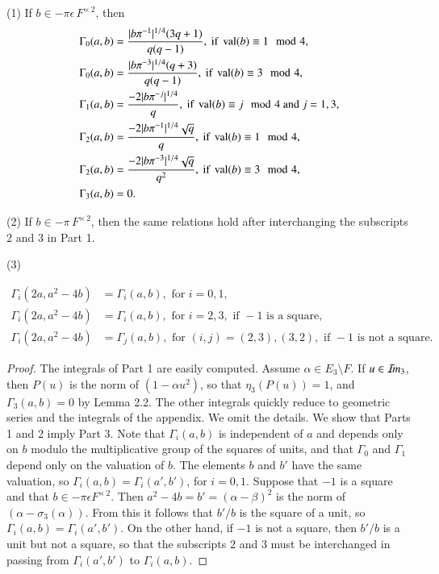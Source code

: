 \documentclass{amsart}
\newcommand\Imm{{\mathcal I\hskip-.2em m}}
\newcommand\val{\operatorname{val}}
\newenvironment{cthm}[1]
  {\renewcommand\thethm{\sc #1}\thm}
  {\endthm}
\begin{document}
\bigskip
\noindent
\begin{cthm}{Lemma 2.6}
(1)  If $b\in -\pi\epsilon\,F^{\times\,2}$, then
\begin{align*}
\Gamma_0(a,b) &= {|b\pi^{-1}|^{1/4}(3q+1)\over q(q-1)}, \text{ if }
			\val(b)\equiv 1 \mod 4,\\
\Gamma_0(a,b) &= {|b\pi^{-3}|^{1/4}(q+3)\over q(q-1)}, \text{ if }
			\val(b)\equiv 3 \mod 4,\\
\Gamma_1(a,b) &= {-2|b\pi^{-j}|^{1/4}\over q}, \text{ if }
			\val(b)\equiv j \mod 4 \text{ and } j=1, 3,\\
\Gamma_2(a,b) &= {-2|b\pi^{-1}|^{1/4}\sqrt{q}\over q}, \text{ if }
			\val(b)\equiv 1 \mod 4,\\
\Gamma_2(a,b) &= {-2|b\pi^{-3}|^{1/4}\sqrt{q}\over q^2}, \text{ if }
			\val(b)\equiv 3 \mod 4,\\
\Gamma_3(a,b) &= 0.
\end{align*}
\smallskip

(2)  If $b\in -\pi\,F^{\times\,2}$, then the same relations
hold after interchanging the subscripts $2$ and $3$ in Part 1.


\smallskip
(3)

\begin{align*}
\Gamma_i(2a,a^2-4b) &= \Gamma_i(a,b), \text{ for } i=0,1,\\
\Gamma_i(2a,a^2-4b) &= \Gamma_i(a,b), \text{ for } i=2,3, \text{ if }
		-1 \text{ is a square,}\\
\Gamma_i(2a,a^2-4b) &= \Gamma_j(a,b), \text{ for } (i,j) = (2,3), (3,2),
		\text{ if } -1 \text { is not a square.}
\end{align*}

\end{cthm}

\smallskip

\noindent
\begin{proof}
The integrals of Part 1 are easily computed. 
Assume 
$\alpha\in E_3\setminus F$.  
If $u\in \Imm_3$, then $P(u)$ is
the norm of $(1-\alpha u^2)$, so that $\eta_3(P(u)) = 1$,
and $\Gamma_3(a,b)=0$ by Lemma 2.2.
The other integrals quickly reduce to geometric series and the
integrals of the appendix.
 We omit the details.
We show that Parts 1 and 2 imply Part 3.
Note that
$\Gamma_i(a,b)$ is independent of $a$ and depends only on $b$ modulo
the multiplicative group of the squares of units, 
and that $\Gamma_0$ and $\Gamma_1$ depend only on the
valuation of $b$.  The elements $b$ and $b'$ have the same
valuation, so $\Gamma_i(a,b) = \Gamma_i(a',b')$, for
$i=0,1$.
Suppose that $-1$ is a square and that 
$b\in -\pi\epsilon F^{\times\, 2}$.
Then $a^2-4b = b' = (\alpha-\beta)^2$ is the norm of $(\alpha-\sigma_3(\alpha))$.
From this it follows that $b'/b$ is the square of a unit,
so $\Gamma_i(a,b) = \Gamma_i(a',b')$.
On the other hand, if
$-1$ is not a square, then 
$b'/b$ is a unit but not a square, so that the subscripts $2$ and $3$
must be interchanged in passing from $\Gamma_i(a',b')$ to
$\Gamma_i(a,b)$.  \end{proof}
\end{document}

